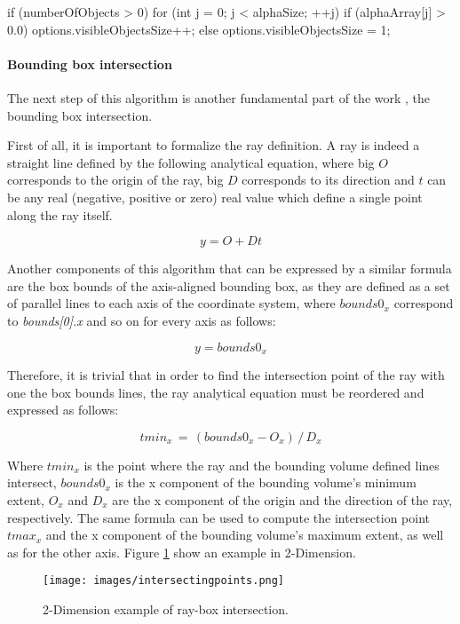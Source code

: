 \documentclass[12pt,a4paper]{extarticle}
\begin{document}
\begin{cpp}[caption={Computation of the number of visible objects concerning the defined elements of the alphaArray with opacity greater than zero},label=code:visibleObjSize]
if (numberOfObjects > 0) {
	for (int j = 0; j < alphaSize; ++j) {
		if (alphaArray[j] > 0.0) {
			options.visibleObjectsSize++;
		}
	}
} else {
	options.visibleObjectsSize = 1;
}
\end{cpp}

\paragraph{Bounding box intersection} The next step of this algorithm is another fundamental part of the work \cite{levoy_1988:4}, the bounding box intersection.

First of all, it is important to formalize the ray definition. A ray is indeed a straight line defined by the following analytical equation, where big $O$ corresponds to the origin of the ray, big $D$ corresponds to its direction and $t$ can be any real (negative, positive or zero) real value which define a single point along the ray itself.

\[
y = O +Dt
\]

Another components of this algorithm that can be expressed by a similar formula are the box bounds of the axis-aligned bounding box,  as they are defined as a set of parallel lines to each axis of the coordinate system, where $bounds0_{x}$ correspond to \textit{bounds[0].x} and so on for every axis as follows:

\[
y = bounds0_{x}
\] 

Therefore, it is trivial that in order to find the intersection point of the ray with one the box bounds lines, the ray analytical equation must be reordered and expressed as follows:

\[
tmin_{x}\,=\,(bounds0_{x} - O_{x})\,/\,D_{x}
\] 

Where $tmin_{x}$ is the point where the ray and the bounding volume defined lines intersect, $bounds0_{x}$ is the x component of the bounding volume's minimum extent, $O_{x}$ and $D_{x}$ are the x component of the origin and the direction of the ray, respectively. The same formula can be used to compute the intersection point $tmax_{x}$ and the x component of the bounding volume's maximum extent, as well as for the other axis. Figure \ref{fig:intersectingpoints} show an example in 2-Dimension.

\begin{figure}[hbtp]
\centering
\texttt{[image: images/intersectingpoints.png]}
\caption{2-Dimension example of ray-box intersection.}
\label{fig:intersectingpoints}
\end{figure}
\end{document}
